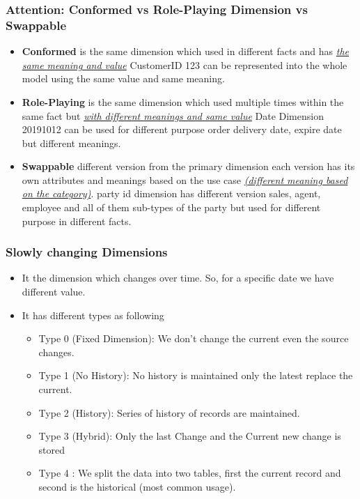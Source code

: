 \begin{frame}
\frametitle{Attention: Conformed vs Role-Playing Dimension vs Swappable}
	\begin{itemize}[<+->]
		\item \textbf{Conformed} is the same dimension which used in different facts and has \textit{\underline{the same meaning and value}} \faEdit \space \faArrowCircleORight \space CustomerID 123 can be represented into the whole model using the same value and same meaning.
		\item \textbf{Role-Playing} is the same dimension which used multiple times within the same fact but \textit{\underline{with different meanings and same value}} \faEdit \space \faArrowCircleORight \space Date Dimension 20191012 can be used for different purpose order delivery date, expire date but different meanings.
		\item \textbf{Swappable} different version from the primary dimension each version has its own attributes and meanings based on the use case \textit{\underline{(different meaning based on the category)}}. \faEdit \space \faArrowCircleORight \space party id dimension has different version sales, agent, employee and all of them sub-types of the party but used for different purpose in different facts.
	\end{itemize}

\end{frame}
\begin{frame}
    \frametitle{Slowly changing Dimensions}
    \begin{itemize}[<+->]
		\item It the dimension which changes over time. So, for a specific date we have different value.
		\item It has different types as following
		    \begin{itemize}[<+->]
        \item Type 0 (Fixed Dimension): We don't change the current even the source changes. 
        \item Type 1 (No History): No history is maintained only the latest replace the current.
        \item Type 2 (History): Series of history of records are maintained.
        \item Type 3 (Hybrid): Only the last Change and the Current new change is stored
        \item Type 4 : We split the data into two tables, first the current record and second is the historical (most common usage).
    \end{itemize}   


    \end{itemize}
\end{frame}

